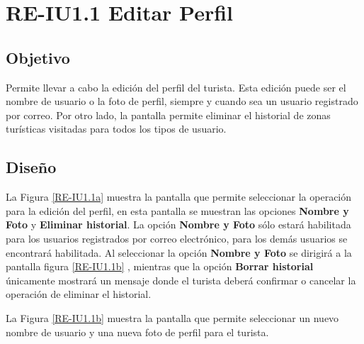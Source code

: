 \newpage
\section{RE-IU1.1 Editar Perfil}

\subsection{Objetivo}
Permite llevar a cabo la edición del perfil del turista. Esta edición puede ser el nombre de usuario o la foto de perfil, siempre y cuando sea un usuario registrado por correo. Por otro lado, la pantalla permite eliminar el historial de zonas turísticas visitadas para todos los tipos de usuario.

\subsection{Diseño}
La Figura \ref{RE-IU1.1a} muestra la pantalla  que permite seleccionar la operación para la edición del perfil, en esta pantalla se muestran las opciones \textbf{Nombre y Foto} y \textbf{Eliminar historial}. La opción \textbf{Nombre y Foto} sólo estará habilitada para los usuarios registrados por correo electrónico, para los demás usuarios se encontrará habilitada. Al seleccionar la opción \textbf{Nombre y Foto} se dirigirá a la pantalla figura \ref{RE-IU1.1b}
, mientras que la opción \textbf{Borrar historial} únicamente mostrará un mensaje donde el turista deberá confirmar o cancelar la operación de eliminar el historial.


La Figura \ref{RE-IU1.1b} muestra la pantalla  que permite seleccionar un nuevo nombre de usuario y una nueva foto de perfil para el turista.



